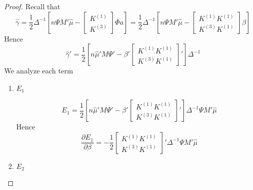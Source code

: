 \begin{proof}
Recall that
$$
\hat{\gamma}
=\frac{1}{2}\Delta^{-1}\left[n\Psi M' \hat{\mu} -\begin{bmatrix}K^{(1)} \\ K^{(3)} \end{bmatrix}\Phi a\right]
=\frac{1}{2}\Delta^{-1}
\left[n\Psi M' \hat{\mu} -\begin{bmatrix}K^{(1)}K^{(1)} \\ K^{(3)}K^{(1)} \end{bmatrix} \beta\right]
$$
Hence
$$
\hat{\gamma}'=\frac{1}{2} \left[n \hat{\mu}' M \Psi' -\beta'\begin{bmatrix}K^{(1)}K^{(1)} \\ K^{(3)}K^{(1)} \end{bmatrix}' \right] \Delta^{-1}
$$
We analyze each term
\begin{enumerate}
    \item $E_1$
    
    $$
    E_1=\frac{1}{2} \left[n \hat{\mu}' M \Psi' -\beta'\begin{bmatrix}K^{(1)}K^{(1)} \\ K^{(3)}K^{(1)} \end{bmatrix}'\right] \Delta^{-1}\Psi M'\hat{\mu}
    $$
    Hence
    $$
    \frac{\partial E_1}{\partial \beta}=-\frac{1}{2} \begin{bmatrix}K^{(1)}K^{(1)} \\ K^{(3)}K^{(1)} \end{bmatrix}'\Delta^{-1}\Psi M'\hat{\mu}
    $$
    
    \item $E_2$
    

\end{enumerate}
\end{proof}
